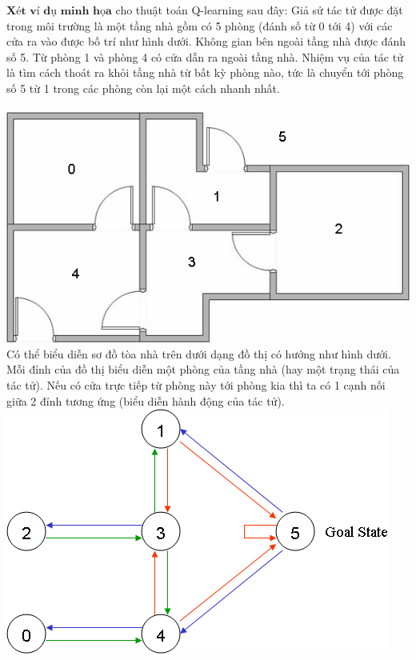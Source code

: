 \documentclass[14pt,a4paper,oneside]{report}		%
\begin{document}
$\textbf{Xét ví dụ minh họa}$ cho thuật toán Q-learning sau đây: Giả sử tác tử được đặt trong môi trường là một tầng nhà gồm có 5 phòng (đánh số từ 0 tới 4) với các cửa ra vào được bố trí như hình dưới. Không gian bên ngoài tầng nhà được đánh số 5. Từ phòng 1 và phòng 4 có cửa dẫn ra ngoài tầng nhà. Nhiệm vụ của tác tử là tìm cách thoát ra khỏi tầng nhà từ bất kỳ phòng nào, tức là chuyển tới phòng số 5 từ 1 trong các phòng còn lại một cách nhanh nhất.\\
\\
\includegraphics[width=\textwidth,height=\textheight,keepaspectratio]{1.png}
Có thể biểu diễn sơ đồ tòa nhà trên dưới dạng đồ thị có hướng như hình dưới. Mỗi đỉnh của đồ thị biểu diễn một phòng của tầng nhà (hay một trạng thái của tác tử). Nếu có cửa trực tiếp từ phòng này tới phòng kia thì ta có 1 cạnh nối giữa 2 đỉnh tương ứng (biểu diễn hành động của tác tử).\\
\includegraphics[width=\textwidth,height=\textheight,keepaspectratio]{2.png}
\\
\end{document}
